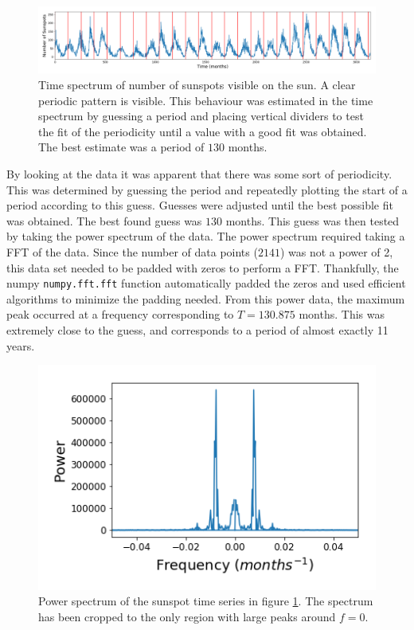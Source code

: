 \documentclass[twocolumn]{article}
\begin{document}
\begin{figure}
\centering
\includegraphics[width=\textwidth]{"sunspot time"}
\caption{Time spectrum of number of sunspots visible on the sun. A clear periodic pattern is visible. This behaviour was estimated in the time spectrum by guessing a period and placing vertical dividers to test the fit of the periodicity until a value with a good fit was obtained. The best estimate was a period of $130$ months.}
\label{fig:sunspottime}
\end{figure}

By looking at the data it was apparent that there was some sort of periodicity. This was determined by guessing the period and repeatedly plotting the start of a period according to this guess. Guesses were adjusted until the best possible fit was obtained. The best found guess was $130$ months. This guess was then tested by taking the power spectrum of the data. The power spectrum required taking a FFT of the data. Since the number of data points ($2141$) was not a power of 2, this data set needed to be padded with zeros to perform a FFT. Thankfully, the numpy \texttt{numpy.fft.fft} function automatically padded the zeros and used efficient algorithms to minimize the padding needed.  From this power data, the maximum peak occurred at a frequency corresponding to $T=130.875$ months. This was extremely close to the guess, and corresponds to a period of almost exactly 11 years.

\begin{figure}
\centering
\includegraphics[width=\linewidth]{SunSpotPowerSpectrum}
\caption{Power spectrum of the sunspot time series in figure \ref{fig:sunspottime}. The spectrum has been cropped to the only region with large peaks around $f=0$.}
\label{fig:SunSpotPowerSpectrum}
\end{figure}
\end{document}

